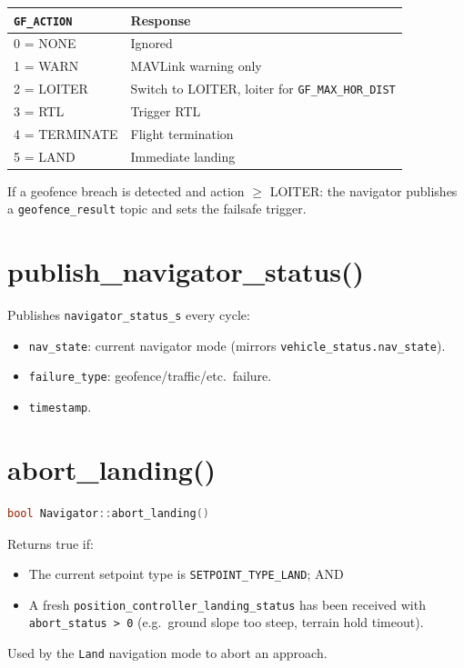 \documentclass[12pt,a4paper]{article}
\begin{document}
\begin{center}\begin{tabular}{ll}\toprule
\texttt{GF\_ACTION} & Response \\\midrule
0 = NONE & Ignored \\
1 = WARN & MAVLink warning only \\
2 = LOITER & Switch to LOITER, loiter for \texttt{GF\_MAX\_HOR\_DIST} \\
3 = RTL & Trigger RTL \\
4 = TERMINATE & Flight termination \\
5 = LAND & Immediate landing \\
\bottomrule\end{tabular}\end{center}

If a geofence breach is detected and action $\geq$ LOITER: the navigator publishes
a \texttt{geofence\_result} topic and sets the failsafe trigger.

\section{publish\_navigator\_status()}

Publishes \texttt{navigator\_status\_s} every cycle:
\begin{itemize}
  \item \texttt{nav\_state}: current navigator mode (mirrors \texttt{vehicle\_status.nav\_state}).
  \item \texttt{failure\_type}: geofence/traffic/etc.\ failure.
  \item \texttt{timestamp}.
\end{itemize}

\section{abort\_landing()}

\begin{lstlisting}[language=C++]
bool Navigator::abort_landing()
\end{lstlisting}

Returns true if:
\begin{itemize}
  \item The current setpoint type is \texttt{SETPOINT\_TYPE\_LAND}; AND
  \item A fresh \texttt{position\_controller\_landing\_status} has been
        received with \texttt{abort\_status > 0} (e.g.\ ground slope too steep,
        terrain hold timeout).
\end{itemize}
Used by the \texttt{Land} navigation mode to abort an approach.
\end{document}
